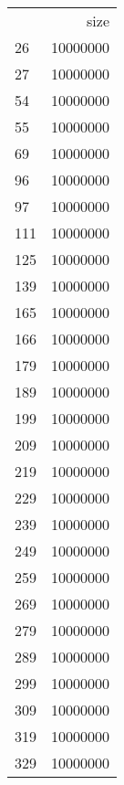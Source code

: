 \begin{tabular}{lr}
 & size \\
26 & 10000000 \\
27 & 10000000 \\
54 & 10000000 \\
55 & 10000000 \\
69 & 10000000 \\
96 & 10000000 \\
97 & 10000000 \\
111 & 10000000 \\
125 & 10000000 \\
139 & 10000000 \\
165 & 10000000 \\
166 & 10000000 \\
179 & 10000000 \\
189 & 10000000 \\
199 & 10000000 \\
209 & 10000000 \\
219 & 10000000 \\
229 & 10000000 \\
239 & 10000000 \\
249 & 10000000 \\
259 & 10000000 \\
269 & 10000000 \\
279 & 10000000 \\
289 & 10000000 \\
299 & 10000000 \\
309 & 10000000 \\
319 & 10000000 \\
329 & 10000000 \\
\end{tabular}
